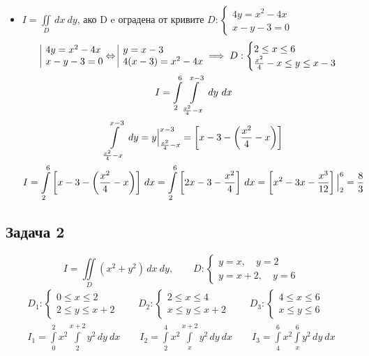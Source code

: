\documentclass[a4paper,fleqn,12pt]{article}
\theoremstyle{definition}
\begin{document}
\begin{itemize}
\item $I = \iint\limits _D \,dx \ dy$, ако D e оградена от кривите $D: \begin{cases} 4y = x^2 - 4x \\ x - y - 3 = 0 \end{cases}$
\begin{gather*}
\begin{array}{|l@{}}
4y = x^2 - 4x \\ 
x - y - 3 = 0
\end{array} \Leftrightarrow
\begin{array}{|l@{}}
y = x - 3 \\
4(x-3) = x^2 - 4x
\end{array}\implies D: \begin{cases} 
2 \leq x \leq 6 \\
\frac{x^2}{4}- x \leq y \leq x - 3 
\end{cases}\\
I = \int\limits_2 ^6 \int\limits_{\frac{x^2}{4} - x} ^{x - 3} \, dy \ dx  \\
\int\limits_{\frac{x^2}{4} - x} ^{x - 3} \, dy  =
 y \Big|_{\frac{x^2}{4} - x} ^{x - 3} = 
\left[ x- 3 - \left( \frac{x^2}{4} - x\right) \right] \\
I = \int\limits_2 ^6 \left[ x- 3 - \left( \frac{x^2}{4} - x\right) \right] \, dx = 
\int\limits_2 ^6 \left[ 2x- 3 - \frac{x^2}{4} \right] \, dx = 
\left[ x^2- 3x - \frac{x^3}{12} \right] \Big|_2 ^6 = \frac{8}{3}
\end{gather*}

\end{itemize}
\subsection*{Задача 2}
$$I = \iint\limits_D (x^2 + y^2) \, dx \ dy, \qquad D: \begin{cases} y = x , \quad y =2 \\ y = x + 2, \quad y = 6 \end{cases}$$
\begin{gather*}
D_1: \begin{cases} 
0\leq x \leq 2 \\
2 \leq y \leq x +2
\end{cases} \qquad 
D_2: \begin{cases} 
2\leq x \leq 4 \\
x \leq y \leq x +2
\end{cases} \qquad 
D_3: \begin{cases} 
4\leq x \leq 6 \\
x \leq y \leq 6
\end{cases} \\
I_1 = \int\limits_0 ^2 x^2 \int\limits_{2} ^{x+2} y^2\, dy \ dx  \qquad
I_2 = \int\limits_2 ^4 x^2 \int\limits_{x} ^{x+2} y^2 \, dy\ dx  \qquad  
I_3 = \int\limits_4 ^6 x^2 \int\limits_{x} ^{6} y^2\, dy \ dx 
\end{gather*}
\end{document}
